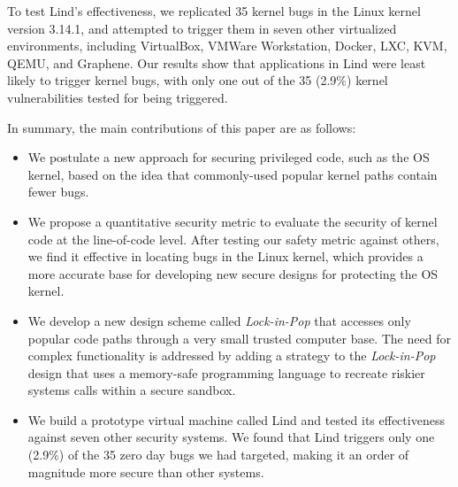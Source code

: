 To test Lind's effectiveness, we replicated 35 kernel bugs in the Linux kernel version 3.14.1, 
and attempted to trigger them in seven other virtualized environments, 
including VirtualBox, VMWare Workstation, 
Docker, LXC, KVM, QEMU, and Graphene. 
Our results show that applications in Lind were least likely to trigger kernel bugs, 
with only one out of the 35 (2.9\%) kernel vulnerabilities tested for being triggered.

In summary, the main contributions of this paper are as follows:

\begin{itemize}\setlength\itemsep{0em}
\item
We postulate a new approach for securing privileged code, 
such as the OS kernel, based on the idea that commonly-used popular kernel paths contain fewer bugs. 

\item
We propose a quantitative security metric to evaluate the security of kernel code at the line-of-code level. 
After testing our safety metric against others, we find it effective in locating bugs in the Linux kernel, 
which provides a more accurate base for developing new secure designs for protecting the OS kernel.

\item
We develop a new design scheme called \emph{Lock-in-Pop} that accesses only popular code paths 
through a very small trusted computer base. 
The need for complex functionality is addressed by adding a strategy to the \emph{Lock-in-Pop} design that 
uses a memory-safe programming language to recreate riskier systems calls within a secure sandbox. 

\item
We build a prototype virtual machine called Lind and tested its effectiveness 
against seven other security systems. We found that Lind triggers only one (2.9\%) of the 35 zero day bugs we had targeted, 
making it an order of magnitude more secure than other systems.
\end{itemize}

%
